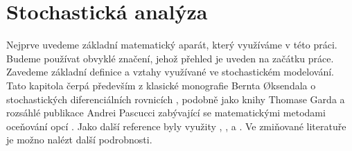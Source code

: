 \documentclass[a4paper,12pt]{report}
\theoremstyle{definition} \newtheorem{definice}[veta]{Definice}
\theoremstyle{remark}
\begin{document}

\chapter{Stochastická analýza}
Nejprve uvedeme základní matematický aparát, který využíváme v této práci.
Budeme používat obvyklé značení, jehož přehled je uveden na začátku práce. 
Zavedeme základní definice a vztahy využívané ve stochastickém modelování.
Tato kapitola čerpá především z klasické monografie Bernta {\O}ksendala o stochastických diferenciálních rovnicích \cite{oksendal2003stochastic}, 
podobně jako knihy Thomase Garda  \cite{gard} 
a rozsáhlé publikace Andrei Pascucci zabývající se matematickými metodami oceňování opcí \cite{pascucci}.
Jako další reference byly využity \cite{karatzas2012brownian}, \cite{allen2010introduction},  \cite{shreve2012stochastic} a \cite{shreve2004stochastic}.
Ve zmiňované literatuře je možno nalézt další podrobnosti.
\end{document}
